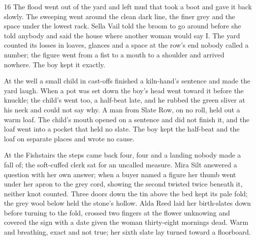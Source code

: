 
\scenebreak


\scenebreak


\scenebreak

\CRtailpiece
\begin{CRchronicle}{16}
The flood went out of the yard and left mud that took a boot and gave it back slowly. The sweeping went around the clean dark line, the finer grey and the space under the lowest rack. Sella Vail told the broom to go around before she told anybody and said the house where another woman would say I. The yard counted its losses in loaves, glances and a space at the row’s end nobody called a number; the figure went from a fist to a mouth to a shoulder and arrived nowhere. The boy kept it exactly.

At the well a small child in cast-offs finished a kiln-hand’s sentence and made the yard laugh. When a pot was set down the boy’s head went toward it before the knuckle; the child’s went too, a half-beat late, and he rubbed the green sliver at his neck and could not say why. A man from Slate Row, on no roll, held out a warm loaf. The child’s mouth opened on a sentence and did not finish it, and the loaf went into a pocket that held no slate. The boy kept the half-beat and the loaf on separate places and wrote no cause.

At the Fishstairs the steps came back four, four and a landing nobody made a fall of; the soft-cuffed clerk sat for an uncalled measure. Mira Silt answered a question with her own answer; when a buyer named a figure her thumb went under her apron to the grey cord, showing the second twisted twice beneath it, neither knot counted. Three doors down the tin above the bed kept its pale fold; the grey wool below held the stone’s hollow. Alda Reed laid her birth-slates down before turning to the fold, crossed two fingers at the flower unknowing and covered the sign with a date given the woman thirty-eight mornings dead. Warm and breathing, exact and not true; her sixth slate lay turned toward a floorboard.


\end{CRchronicle}
